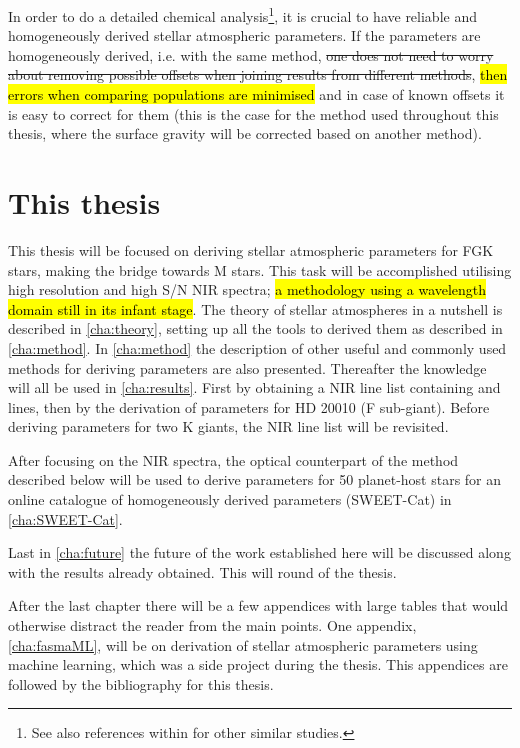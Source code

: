 In order to do a detailed chemical analysis\footnote{See also references within
\citet{Adibekyan2012} for other similar studies.}, it is crucial to have reliable and homogeneously
derived stellar atmospheric parameters. If the parameters are homogeneously derived, i.e. with the
same method, \st{one does not need to worry about removing possible offsets when joining results
from different methods}, \hl{ then errors when comparing populations are minimised } and in case of
known offsets it is easy to correct for them (this is the case for the method used throughout this
thesis, where the surface gravity will be corrected based on another method).


\section{This thesis}
\label{sec:this_thesis}

This thesis will be focused on deriving stellar atmospheric parameters for FGK stars, making the
bridge towards M stars. This task will be accomplished utilising high resolution and high S/N NIR
spectra; \hl{a methodology using a wavelength domain still in its infant stage}. The theory of
stellar atmospheres in a nutshell is described in \cref{cha:theory}, setting up all the tools to
derived them as described in \cref{cha:method}. In \cref{cha:method} the description of other useful
and commonly used methods for deriving parameters are also presented. Thereafter the knowledge will
all be used in \cref{cha:results}. First by obtaining a NIR line list containing  and
 lines, then by the derivation of parameters for HD 20010 (F sub-giant). Before deriving
parameters for two K giants, the NIR line list will be revisited.

After focusing on the NIR spectra, the optical counterpart of the method described below will be
used to derive parameters for 50 planet-host stars for an online catalogue of homogeneously derived
parameters (SWEET-Cat) in \cref{cha:SWEET-Cat}.

Last in \cref{cha:future} the future of the work established here will be discussed along with the
results already obtained. This will round of the thesis.

After the last chapter there will be a few appendices with large tables that would otherwise
distract the reader from the main points. One appendix, \cref{cha:fasmaML}, will be on derivation of
stellar atmospheric parameters using machine learning, which was a side project during the thesis.
This appendices are followed by the bibliography for this thesis.
